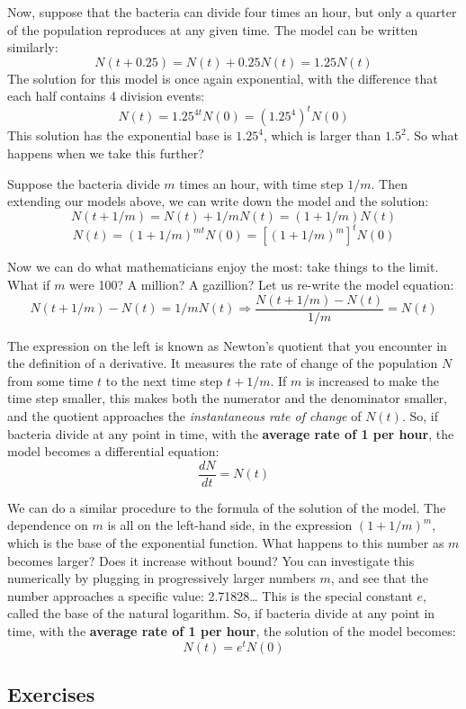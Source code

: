 \documentclass[
]{book}
\theoremstyle{definition}
\theoremstyle{definition}
\theoremstyle{definition}
\theoremstyle{remark}
\begin{document}
Now, suppose that the bacteria can divide four times an hour, but only a quarter of the population reproduces at any given time. The model can be written similarly:
\[N(t+0.25) = N(t) + 0.25N(t) = 1.25N(t)\]
The solution for this model is once again exponential, with the difference that each half contains 4 division events:
\[N(t) = 1.25^{4t}N(0) = (1.25^4)^t N(0)\]
This solution has the exponential base is \(1.25^4\), which is larger than \(1.5^2\). So what happens when we take this further?

Suppose the bacteria divide \(m\) times an hour, with time step \(1/m\). Then extending our models above, we can write down the model and the solution:
\[ N(t + 1/m) = N(t) + 1/m N(t) = (1+1/m) N(t) \]
\[ N(t) = (1+1/m)^{mt} N(0) = [(1+1/m)^m]^t N(0)\]

Now we can do what mathematicians enjoy the most: take things to the limit. What if \(m\) were 100? A million? A gazillion? Let us re-write the model equation:
\[ N(t+1/m) - N(t) = 1/m N(t) \Rightarrow \frac{N(t+1/m) - N(t) }{1/m} = N(t)\]

The expression on the left is known as Newton's quotient that you encounter in the definition of a derivative. It measures the rate of change of the population \(N\) from some time \(t\) to the next time step \(t+1/m\). If \(m\) is increased to make the time step smaller, this makes both the numerator and the denominator smaller, and the quotient approaches the \emph{instantaneous rate of change} of \(N(t)\). So, if bacteria divide at any point in time, with the \textbf{average rate of 1 per hour}, the model becomes a differential equation:
\[ \frac{dN}{dt} = N(t)\]

We can do a similar procedure to the formula of the solution of the model. The dependence on \(m\) is all on the left-hand side, in the expression \((1+1/m)^m\), which is the base of the exponential function. What happens to this number as \(m\) becomes larger? Does it increase without bound? You can investigate this numerically by plugging in progressively larger numbers \(m\), and see that the number approaches a specific value: 2.71828\ldots{} This is the special constant \(e\), called the base of the natural logarithm. So, if bacteria divide at any point in time, with the \textbf{average rate of 1 per hour}, the solution of the model becomes:
\[ N(t) = e^t N(0)\]

\hypertarget{exercises-14}{%
\subsection{Exercises}\label{exercises-14}}
\end{document}
